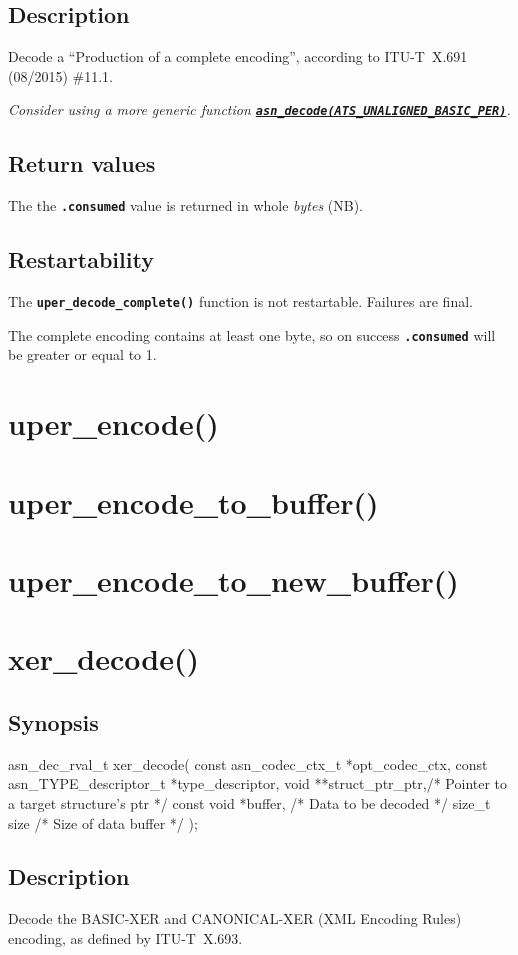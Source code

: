\documentclass[english,oneside,12pt]{book}
\newcommand{\apisection}[2]{\clearpage\section{\label{#1}#2}}
\newcommand{\api}[2]{\hyperref[#1]{\code{#2}}}
\newcommand{\code}[1]{\texttt{\textbf{\lstinline{#1}}}}
\begin{document}
\subsection*{Description}

Decode a ``Production of a complete encoding'',
according to ITU-T~X.691 (08/2015) \#11.1.\newline

\noindent\emph{Consider using a more generic function \api{sec:asn_decode}{asn_decode(ATS_UNALIGNED_BASIC_PER)}.}

\subsection*{Return values}


The the \code{.consumed} value is returned in whole \emph{bytes} (NB).

\subsection*{Restartability}
The \code{uper_decode_complete()} function is not restartable.
Failures are final.

The complete encoding contains at least one byte, so on success
\code{.consumed} will be greater or equal to 1.

\apisection{sec:uper_encode}{uper\_encode()}
\apisection{sec:uper_encode_to_buffer}{uper\_encode\_to\_buffer()}
\apisection{sec:uper_encode_to_new_buffer}{uper\_encode\_to\_new\_buffer()}
\apisection{sec:xer_decode}{xer\_decode()}

\subsection*{Synopsis}

\begin{signature}
asn_dec_rval_t xer_decode(
    const asn_codec_ctx_t *opt_codec_ctx,
    const asn_TYPE_descriptor_t *type_descriptor,
    void **struct_ptr_ptr,/* Pointer to a target structure's ptr */
    const void *buffer,   /* Data to be decoded */
    size_t size           /* Size of data buffer */
);
\end{signature}

\subsection*{Description}

Decode the BASIC-XER and CANONICAL-XER (XML Encoding Rules) encoding,
as defined by ITU-T~X.693.\newline
\end{document}
